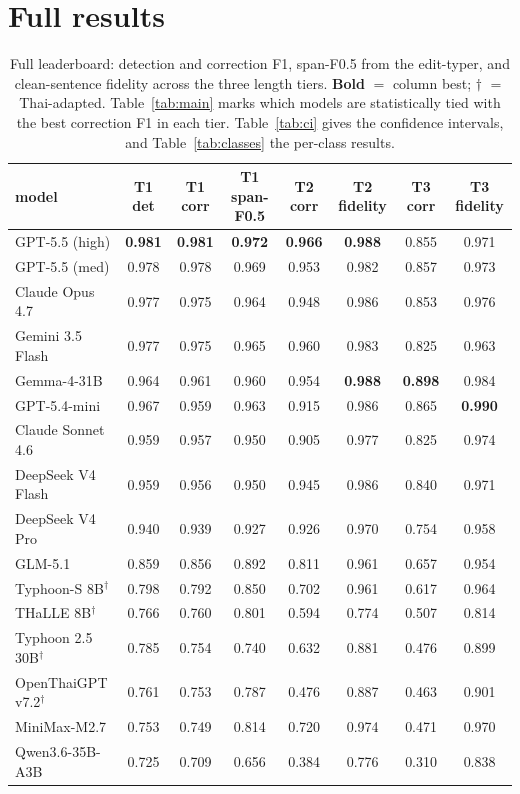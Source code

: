 \documentclass[11pt]{article}
\begin{document}
\section{Full results}
\label{app:results}
\begin{table}[t]
\centering\small
\begin{tabular}{@{}lccccccc@{}}
\toprule
model & T1 det & T1 corr & T1 span-F0.5 & T2 corr & T2 fidelity & T3 corr & T3 fidelity \\
\midrule
GPT-5.5 (high)        & \textbf{0.981} & \textbf{0.981} & \textbf{0.972} & \textbf{0.966} & \textbf{0.988} & 0.855 & 0.971 \\
GPT-5.5 (med)         & 0.978 & 0.978 & 0.969 & 0.953 & 0.982 & 0.857 & 0.973 \\
Claude Opus 4.7       & 0.977 & 0.975 & 0.964 & 0.948 & 0.986 & 0.853 & 0.976 \\
Gemini 3.5 Flash      & 0.977 & 0.975 & 0.965 & 0.960 & 0.983 & 0.825 & 0.963 \\
Gemma-4-31B           & 0.964 & 0.961 & 0.960 & 0.954 & \textbf{0.988} & \textbf{0.898} & 0.984 \\
GPT-5.4-mini          & 0.967 & 0.959 & 0.963 & 0.915 & 0.986 & 0.865 & \textbf{0.990} \\
Claude Sonnet 4.6     & 0.959 & 0.957 & 0.950 & 0.905 & 0.977 & 0.825 & 0.974 \\
DeepSeek V4 Flash     & 0.959 & 0.956 & 0.950 & 0.945 & 0.986 & 0.840 & 0.971 \\
DeepSeek V4 Pro       & 0.940 & 0.939 & 0.927 & 0.926 & 0.970 & 0.754 & 0.958 \\
GLM-5.1               & 0.859 & 0.856 & 0.892 & 0.811 & 0.961 & 0.657 & 0.954 \\
Typhoon-S 8B$^\dagger$& 0.798 & 0.792 & 0.850 & 0.702 & 0.961 & 0.617 & 0.964 \\
THaLLE 8B$^\dagger$   & 0.766 & 0.760 & 0.801 & 0.594 & 0.774 & 0.507 & 0.814 \\
Typhoon 2.5 30B$^\dagger$& 0.785 & 0.754 & 0.740 & 0.632 & 0.881 & 0.476 & 0.899 \\
OpenThaiGPT v7.2$^\dagger$& 0.761 & 0.753 & 0.787 & 0.476 & 0.887 & 0.463 & 0.901 \\
MiniMax-M2.7          & 0.753 & 0.749 & 0.814 & 0.720 & 0.974 & 0.471 & 0.970 \\
Qwen3.6-35B-A3B       & 0.725 & 0.709 & 0.656 & 0.384 & 0.776 & 0.310 & 0.838 \\
\bottomrule
\end{tabular}
\caption{Full leaderboard: detection and correction F1, span-F0.5 from the edit-typer, and
clean-sentence fidelity across the three length tiers. \textbf{Bold} $=$ column best;
$\dagger$ $=$ Thai-adapted. Table~\ref{tab:main} marks which models are statistically tied with
the best correction F1 in each tier. Table~\ref{tab:ci} gives the confidence intervals, and
Table~\ref{tab:classes} the per-class results.}
\label{tab:leaderboard}
\end{table}
\end{document}

